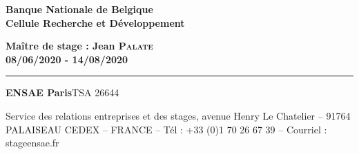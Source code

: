 {\vfill
    
\begin{minipage}{0.5\textwidth}
    \begin{flushleft} \large 
    \textbf{Banque Nationale de Belgique\\
        Cellule Recherche et Développement
    }
  \end{flushleft}
\end{minipage} 
\begin{minipage}{0.5\textwidth}
  \begin{flushright} \large
    \textbf{
        Maître de stage : Jean \textsc{Palate}\\
        08/06/2020 - 14/08/2020
    }
  \end{flushright}
\end{minipage}    

\vspace*{1cm}


\textcolor{rougeENSAE}{\rule{10mm}{1.5mm}}

\scriptsize
\textbf{ENSAE Paris}\newline TSA 26644

Service des relations entreprises et des stages, avenue Henry Le Chatelier -- 91764 PALAISEAU CEDEX -- FRANCE -- Tél : +33 (0)1 70 26 67 39 -- Courriel : stageensae.fr

\normalsize

\clearpage
\setcounter{page}{0}
}

\makeatother%

\usepackage{stmaryrd}
\usepackage{multicol}
\usepackage{graphicx}
\usepackage{animate, dsfont, here, xspace}
\usepackage{tikz,pgfplots}
 \pgfplotsset{compat=1.17}
%


\DeclareMathOperator{\e}{e}
\renewcommand{\P}{\mathds{P}} %
\newcommand\N{\mathds{N}}
\newcommand\R{\mathds{R}}


\newcommand\1{\mathds{1}}
\newcommand{\E}[2][]{{\mathds{E}}_{#1}
  \def\temp{#2}\ifx\temp\empty
  \else
    \left[#2\right]
  \fi
}
\newcommand{\V}[2][]{{\mathds{V}}_{#1}
  \def\temp{#2}\ifx\temp\empty
  \else
    \left[#2\right]
  \fi
}
\newcommand\ud{\,\mathrm{d}}

\usepackage{environ}
\usepackage[tikz]{bclogo}

